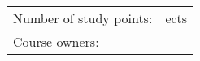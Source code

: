 \vspace{5cm}

\begin{center}

\Large \textbf \organisatie
\vspace{1.5cm}
\HRule \\[0.4cm]
\Huge \textbf \modulenaam
\vspace{1.7cm}
\Large \textbf  \modulecode \\
\studiejaar
\vspace{0.4cm}
\HRule \\[1.5cm]
\end{center}
\vfill

\begin{tabular}{l l}
	Number of study points:  & \stdPunten{} ects\\
	Course owners: & \author\\
\end{tabular}

